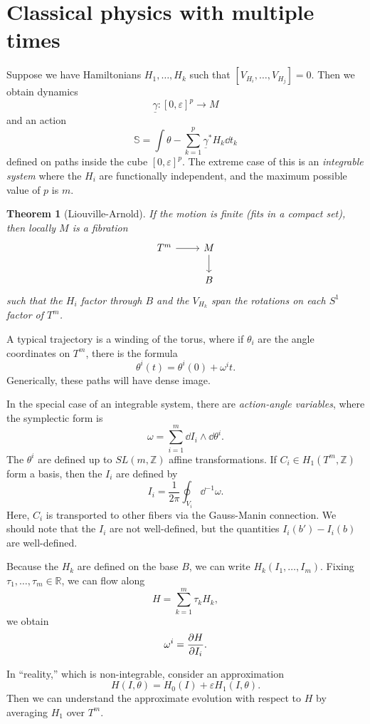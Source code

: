 \documentclass[leqno, openany]{memoir}
\newtheorem{thm}{Theorem}[section]
\theoremstyle{definition}
\theoremstyle{remark}
\theoremstyle{plain}
\theoremstyle{definition}
\theoremstyle{remark}
\newcommand{\R}{\mathbb{R}}
\newcommand{\Z}{\mathbb{Z}}
\newcommand{\ep}{\varepsilon}
\newcommand{\ul}[1]{\underline{#1}}
\begin{document}
\section{Classical physics with multiple times}
\label{sec:times}

Suppose we have Hamiltonians $H_1, \ldots, H_k$ such that $[V_{H_i}, \ldots, V_{H_j}] = 0$. Then we obtain dynamics
\[ \ul{\gamma} \colon [0, \ep]^p \to M \]
and an action
\[ \mathbb{S} = \int \theta - \sum_{k=1}^p \ul{\gamma}^* H_k \dd{t_k} \]
defined on paths inside the cube $[0,\ep]^p$. The extreme case of this is an \textit{integrable system} where the $H_i$ are functionally independent, and the maximum possible value of $p$ is $m$.

\begin{thm}[Liouville-Arnold]
  If the motion is finite (fits in a compact set), then locally $M$ is a fibration
  \begin{equation*}
    \begin{tikzcd}
      T^m \ar{r} & M \ar{d} \\
      & B
    \end{tikzcd}
  \end{equation*}
  such that the $H_i$ factor through $B$ and the $V_{H_k}$ span the rotations on each $S^1$ factor of $T^m$.
\end{thm}

A typical trajectory is a winding of the torus, where if $\theta_i$ are the angle coordinates on $T^m$, there is the formula
\[ \theta^i(t) = \theta^i(0) + \omega^i t. \]
Generically, these paths will have dense image.

In the special case of an integrable system, there are \textit{action-angle variables}, where the symplectic form is
\[ \omega = \sum_{i=1}^m \dd{I_i} \wedge \dd{\theta^i}. \]
The $\theta^i$ are defined up to $SL(m, \Z)$ affine transformations. If $C_i \in H_1(T^m, \Z)$ form a basis, then the $I_i$ are defined by
\[ I_i = \frac{1}{2\pi} \oint_{V_i} \dd^{-1} \omega. \]
Here, $C_i$ is transported to other fibers via the Gauss-Manin connection. We should note that the $I_i$ are not well-defined, but the quantities $I_i(b') - I_i(b)$ are well-defined.

Because the $H_k$ are defined on the base $B$, we can write $H_k(I_1, \ldots, I_m)$. Fixing $\tau_1, \ldots, \tau_m \in \R$, we can flow along
\[ H = \sum_{k=1}^m \tau_k H_k, \]
we obtain
\[ \omega^i = \pdv{H}{I_i}. \]

In ``reality,'' which is non-integrable, consider an approximation
\[ H(I,\theta) = H_0(I) + \ep H_1(I, \theta). \]
Then we can understand the approximate evolution with respect to $H$ by averaging $H_1$ over $T^m$.
\end{document}
